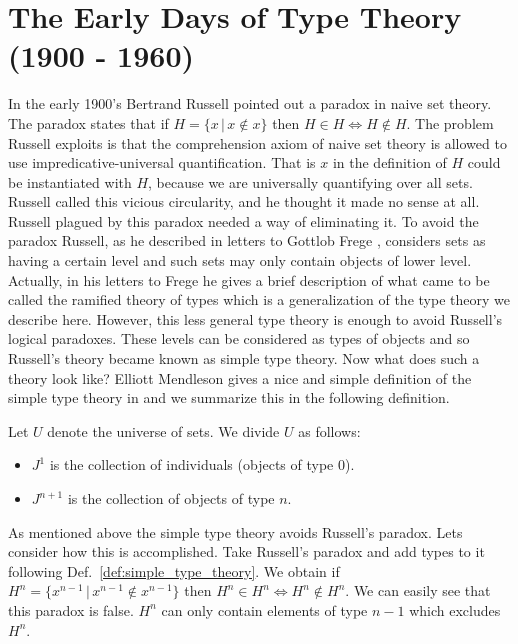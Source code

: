 \section{The Early Days of Type Theory (1900 - 1960)}
\label{sec:the_early_days_of_type_theory}

In the early 1900's Bertrand Russell pointed out a paradox in naive
set theory.  The paradox states that if $H = \{ x\,|\,x \not \in x \}$
then $H \in H \iff H \not \in H$.  The problem Russell exploits is
that the comprehension axiom of naive set theory is allowed to use
impredicative-universal quantification. That is $x$ in the definition
of $H$ could be instantiated with $H$, because we are universally
quantifying over all sets.  Russell called this vicious circularity,
and he thought it made no sense at all. Russell plagued by this
paradox needed a way of eliminating it.  To avoid the paradox Russell,
as he described in letters to Gottlob Frege \cite{Hintikka:1995,
  Heijenoort:1967}, considers sets as having a certain level and such
sets may only contain objects of lower level.  Actually, in his
letters to Frege he gives a brief description of what came to be
called the ramified theory of types which is a generalization of the
type theory we describe here.  However, this less general type theory
is enough to avoid Russell's logical paradoxes.  These levels can be
considered as types of objects and so Russell's theory became known as
simple type theory.  Now what does such a theory look like?  Elliott
Mendleson gives a nice and simple definition of the simple type theory
in \cite{Mendelson:2009} and we summarize this in the following
definition.
\begin{definition}
  \label{def:simple_type_theory}
  Let $U$ denote the universe of sets. We divide $U$ as follows:
  \begin{itemize}
  \item $J^1$ is the collection of individuals (objects of type $0$).
  \item $J^{n+1}$ is the collection of objects of type $n$.
  \end{itemize}
\end{definition}
As mentioned above the simple type theory avoids Russell's paradox.
Lets consider how this is accomplished.  Take Russell's paradox
and add types to it following Def.~\ref{def:simple_type_theory}.  We
obtain if $H^n = \{ x^{n-1}\,|\,x^{n-1} \not \in x^{n-1} \}$ then $H^n
\in H^n \iff H^n \not \in H^n$.  We can easily see that this paradox is
false.  $H^n$ can only contain elements of type $n-1$ which excludes
$H^n$.

